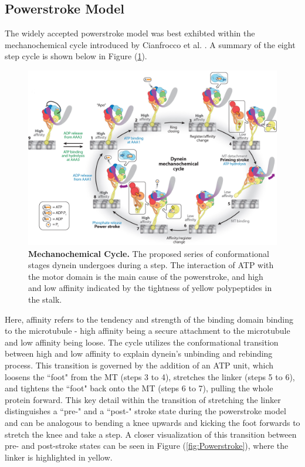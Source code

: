 \subsection{Powerstroke Model}

The widely accepted powerstroke model was best exhibted within the mechanochemical cycle introduced by Cianfrocco et al. \cite{Cianfrocco2015mechanism}. A summary of the eight step cycle is shown below in Figure (\ref{fig:MechanochemicalCycle}).

\begin{figure}[H]
	\centering
	\includegraphics[width=1\columnwidth]{Figures/mechanochemical_cycle.jpeg}
	\caption[Mechanochemical Cycle]{\textbf{Mechanochemical Cycle.} The proposed series of conformational stages dynein undergoes during a step. The interaction of ATP with the motor domain is the main cause of the powerstroke, and high and low affinity indicated by the tightness of yellow polypeptides in the stalk. \cite{Cianfrocco2015mechanism}}
	\label{fig:MechanochemicalCycle}
\end{figure}

Here, affinity refers to the tendency and strength of the binding domain binding to the microtubule - high affinity being a secure attachment to the microtubule and low affinity being loose. The cycle utilizes the conformational transition between high and low affinity to explain dynein's unbinding and rebinding process. This transition is governed by the addition of an ATP unit, which loosens the ``foot" from the MT (steps 3 to 4), stretches the linker (steps 5 to 6), and tightens the ``foot" back onto the MT (steps 6 to 7), pulling the whole protein forward. This key detail within the transition of stretching the linker distinguishes a ``pre-" and a ``post-" stroke state during the powerstroke model and can be analogous to bending a knee upwards and kicking the foot forwards to stretch the knee and take a step. A closer visualization of this transition between pre- and post-stroke states can be seen in Figure (\ref{fig:Powerstroke}), where the linker is highlighted in yellow.  

